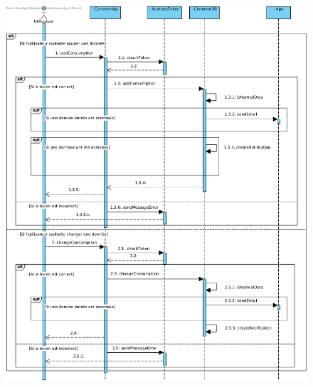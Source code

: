 \newpage
\begin{figure}[h]
\centering
\includegraphics[height=0.7\textheight]{extension-adrien/Sequence/img/gerer.png}
\end{figure}
